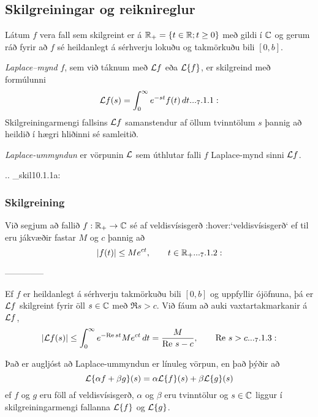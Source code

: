 \subsection{ Skilgreiningar og reiknireglur}  

\noindent
Látum $f$ vera fall sem skilgreint er á 
${\mathbb R}_+=\{t\in {\mathbb R}; t\geq 0\}$ með gildi í ${\mathbb C}$ og gerum ráð fyrir að
$f$ sé heildanlegt á sérhverju lokuðu og takmörkuðu bili $[0,b]$.


{\it Laplace--mynd} $f$, 
sem við táknum með ${\cal L} f$ eða ${\cal L}\{f\}$, er skilgreind með
formúlunni
 \begin{equation*}\L f(s)=\int_0\sp \infty e\sp{-st}f(t)\, dt.

.. _7.1.1:

 \end{equation*}
Skilgreiningarmengi fallsins ${\cal L} f$ samanstendur af öllum
tvinntölum $s$ þannig að heildið í hægri hliðinni sé samleitið.  


{\it Laplace-ummyndun} er vörpunin ${\cal L}$ sem úthlutar falli $f$ 
Laplace-mynd sinni ${\cal L} f$.



.. _skil10.1.1a:

\subsubsection{Skilgreining}
Við segjum að fallið $f:{\mathbb R}_+\to {\mathbb C}$ sé af
veldisvísisgerð :hover:`veldisvísisgerð` ef til eru
jákvæðir fastar $M$ og $c$ þannig að 
 \begin{equation*}|f(t)|\leq Me\sp{c t}, \qquad t\in \R_+.

.. _7.1.2:

 \end{equation*}


--------------



Ef $f$ er heildanlegt á sérhverju takmörkuðu bili $[0,b]$ og uppfyllir 
ójöfnuna, þá er ${\cal L} f$ skilgreint fyrir öll $s\in {\mathbb C}$ með $\Re s
>c$.   Við fáum að auki
vaxtartakmarkanir á ${\cal L} f$,
 \begin{equation*}
|\L f(s) |\leq \int_0\sp\infty e\sp{-\Re st} Me\sp{c t} \, dt =
\dfrac M{\Re\,  s-c}, \qquad \Re\,  s>c.


.. _7.1.3:

 \end{equation*}


Það er augljóst að Laplace-ummyndun er línuleg vörpun, en það þýðir að
$$
{\cal L}\{\alpha f+\beta g\}(s)=\alpha{\cal L}\{f\}(s)+\beta{\cal L}\{g\}(s)
$$
ef $f$ og $g$ eru föll af veldisvísisgerð, $\alpha$ og $\beta$ eru
tvinntölur og $s\in {\mathbb C}$ liggur í skilgreiningarmengi fallanna
${\cal L}\{f\}$ og ${\cal L}\{g\}$.


